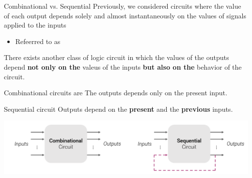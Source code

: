     \begin{parag}{Combinational vs. Sequential}
        Previously, we considered circuits where the value of each output depends solely and almost instantaneously on the values of signals applied to the inputs
        \begin{itemize}
            \item Refeerred to as 
        \end{itemize}
        There exists another class of logic circuit in which the values of the outputs depend \textbf{not only on the}  valeus of the inputs \textbf{but  also on the}  behavior of the circuit.
    
        \begin{subparag}{Combinational circuits are }
            The outputs depends only on the present input.
        \end{subparag}
        \begin{subparag}{Sequential circuit}
            Outputs depend on the \textbf{present} and the \textbf{previous} inputs.
        \end{subparag}
        \begin{center}
            \includegraphics[scale=0.5]{22025-03-31.png}
        \end{center}
        
    \end{parag}
